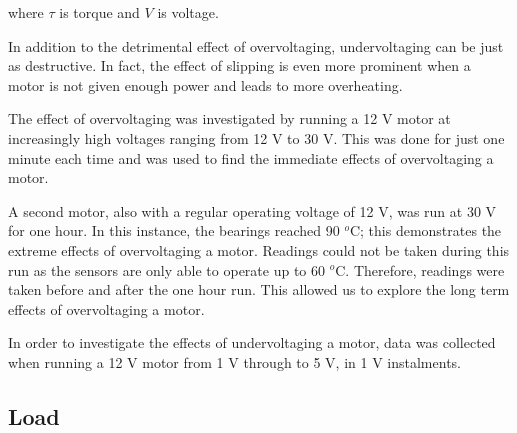 where $\tau$ is torque and $V$ is voltage.

In addition to the detrimental effect of overvoltaging, undervoltaging can be just as destructive. In fact, the effect of slipping is even more prominent when a motor is not given enough power and leads to more overheating.


The effect of overvoltaging  was investigated by running a 12 V motor at increasingly high voltages ranging from 12 V to 30 V. This was done for just one minute each time and was used to find the immediate effects of overvoltaging a motor.
    

A second motor, also with a regular operating voltage of 12 V, was run at 30 V for one hour. In this instance, the bearings reached 90 $^o$C; this demonstrates the extreme effects of overvoltaging a motor. Readings could not be taken during this run as the sensors are only able to operate %
up to 60 $^o$C. %
Therefore, readings were taken before and after the one hour run. This allowed us to explore the long term effects of overvoltaging a motor.


In order to investigate the effects of undervoltaging a motor, data was collected when running a 12 V motor from 1 V through to 5 V, in 1 V instalments. 




\subsection{Load}

